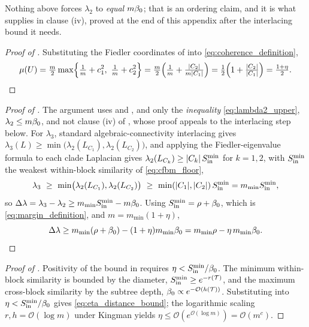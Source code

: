 \noindent Nothing above forces $\lambda_2$ to \emph{equal} $m\beta_0$; that is an
ordering claim, and it is what  supplies in clause (iv), proved at
the end of this appendix after the interlacing bound it needs.

\begin{proof}[Proof of ]
Substituting the Fiedler coordinates of  into
\eqref{eq:coherence_definition},
\[
   \coh=\tfrac m2\max\Bigl\{\tfrac1m+c_1^2,\ \tfrac1m+c_2^2\Bigr\}
       =\tfrac m2\Bigl(\tfrac1m+\tfrac{|C_2|}{m|C_1|}\Bigr)
       =\tfrac12\Bigl(1+\tfrac{|C_2|}{|C_1|}\Bigr)=\tfrac{1+\eta}{2}. \qedhere
\]
\end{proof}

\begin{proof}[Proof of ]
The argument uses  and , and only the
\emph{inequality} \eqref{eq:lambda2_upper}, $\lambda_2\le m\beta_0$, and
not clause (iv) of , whose proof appeals to the interlacing step
below.
For $\lambda_3$, standard algebraic-connectivity interlacing gives
$\lambda_3(L)\ge\min\bigl(\lambda_2(L_{C_1}),\lambda_2(L_{C_2})\bigr)$, and applying
the Fiedler-eigenvalue formula to each clade Laplacian gives
$\lambda_2(L_{C_k})\ge|C_k|\,S_{\mathrm{in}}^{\min}$ for $k=1,2$, with $S_{\mathrm{in}}^{\min}$ the weakest
within-block similarity of \eqref{eq:cfbm_floor},
\begin{equation}\label{eq:lambda3_lower}
   \lambda_3\ \ge\ \min\bigl(\lambda_2(L_{C_1}),\lambda_2(L_{C_2})\bigr)
   \ \ge\ \min(|C_1|,|C_2|)\,S_{\mathrm{in}}^{\min}=m_{\min}S_{\mathrm{in}}^{\min},
\end{equation}
so $\Delta\lambda=\lambda_3-\lambda_2\ge m_{\min}S_{\mathrm{in}}^{\min}-m\beta_0$. Using
$S_{\mathrm{in}}^{\min}=\rho+\beta_0$, which is \eqref{eq:margin_definition}, and
$m=m_{\min}(1+\eta)$,
\[
   \Delta\lambda\ge m_{\min}(\rho+\beta_0)-(1+\eta)m_{\min}\beta_0
        =m_{\min}\rho-\eta\,m_{\min}\beta_0. \qedhere
\]
\end{proof}


\begin{proof}[Proof of ]
Positivity of the bound in  requires
$\eta<S_{\mathrm{in}}^{\min}/\beta_0$. The minimum within-block similarity is bounded by
the diameter, $S_{\mathrm{in}}^{\min}\ge e^{-r(\mathcal T)}$, and the maximum cross-block
similarity by the subtree depth, $\beta_0\propto e^{-\mathcal O(h(\mathcal T))}$.
Substituting into $\eta<S_{\mathrm{in}}^{\min}/\beta_0$ gives \eqref{eq:eta_distance_bound};
the logarithmic scaling $r,h=\mathcal O(\log m)$ under Kingman yields
$\eta\le\mathcal O(e^{\mathcal O(\log m)})=\mathcal O(m^c)$.
\end{proof}

